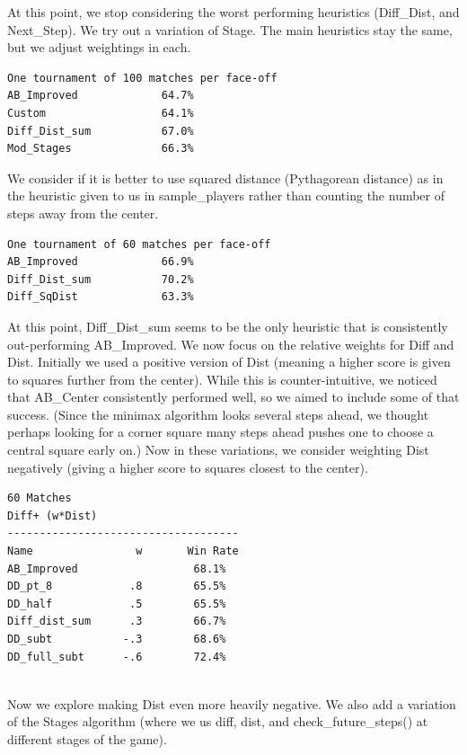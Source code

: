 \documentclass[a4paper,12pt]{article}
\begin{document}
At this point, we stop considering the worst performing heuristics (Diff\_Dist, and Next\_Step). We try out a variation of
Stage.  The main heuristics stay the same, but we adjust weightings in each.


\begin{verbatim}
One tournament of 100 matches per face-off
AB_Improved             64.7%
Custom                  64.1%
Diff_Dist_sum           67.0%
Mod_Stages              66.3%

\end{verbatim}

We consider if it is better to use squared distance (Pythagorean distance) as in the heuristic given to us in sample\_players rather than counting the number of steps away from the center.

\begin{verbatim}
One tournament of 60 matches per face-off
AB_Improved             66.9%
Diff_Dist_sum           70.2%
Diff_SqDist             63.3%

\end{verbatim}

At this point, Diff\_Dist\_sum seems to be the only heuristic that is consistently out-performing AB\_Improved. We now focus on the relative weights
for Diff and Dist.   Initially we used a positive version of Dist (meaning a higher score is given to squares further from the center). While this is counter-intuitive, we noticed that AB\_Center consistently performed well, so we aimed to include some of that success.  (Since the minimax algorithm looks several steps ahead, we thought perhaps looking for a corner square many steps ahead pushes one to choose a central square early on.)   Now in these variations, we consider weighting
Dist negatively (giving a higher score to squares closest to the center).


\begin{verbatim}
60 Matches
Diff+ (w*Dist)
------------------------------------
Name                w       Win Rate
AB_Improved                  68.1%
DD_pt_8            .8        65.5%				
DD_half            .5        65.5%				
Diff_dist_sum      .3        66.7%				
DD_subt           -.3        68.6%				
DD_full_subt      -.6        72.4%				


\end{verbatim}

Now we explore making Dist even more heavily negative. We also add a variation of the Stages algorithm (where we us diff, dist,
and check\_future\_steps() at different stages of the game).
\end{document}
